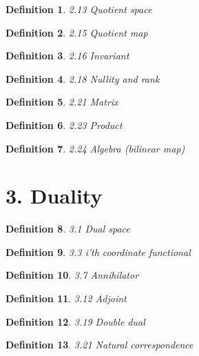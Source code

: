 \documentclass[12pt]{article}
\theoremstyle{plain}
\newtheorem{definition}{Definition}
\begin{document}
\begin{definition} 
 2.13 Quotient space  
\end{definition}


\begin{definition} 
 2.15 Quotient map 
\end{definition}



\begin{definition} 
  2.16 Invariant 
\end{definition}


\begin{definition} 
 2.18 Nullity and rank 
\end{definition}


\begin{definition} 
 2.21 Matrix 
\end{definition}


\begin{definition} 
 2.23 Product 
\end{definition}


\begin{definition} 
  2.24 Algebra (bilinear map) 
\end{definition}

\section{3. Duality}


\begin{definition} 
 3.1 Dual space 
\end{definition}



\begin{definition} 
 3.3 i'th coordinate functional 
\end{definition}



\begin{definition} 
 3.7 Annihilator  
\end{definition}


\begin{definition} 
 3.12 Adjoint  
\end{definition}


\begin{definition} 
 3.19 Double dual 
\end{definition}


\begin{definition} 
 3.21 Natural correspondence 
\end{definition}
\end{document}
